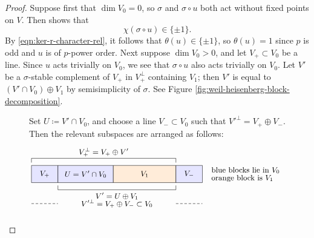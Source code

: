 \documentclass[reqno]{amsart}
\numberwithin{equation}{subsection}
\theoremstyle{remark}
\numberwithin{equation}{subsection}
\numberwithin{figure}{subsection}
\begin{document}
\begin{proof}
Suppose first that $\dim V_0 = 0$, so $\sigma$ and $\sigma \circ u$ both act without fixed points on $V$. Then \cite[Theorem 4.9.1(a)]{Ger77} shows that
\[
\chi(\sigma \circ u) \in \{\pm 1\}.
\]
By \eqref{eqn:ker-r-character-rel}, it follows that $\theta(u) \in \{\pm 1\}$, so $\theta(u) = 1$ since $p$ is odd and $u$ is of $p$-power order.  Next suppose $\dim V_0 > 0$, and let $V_+ \subset V_0$ be a line. Since $u$ acts trivially on $V_0$, we see that $\sigma \circ u$ also acts trivially on $V_0$. Let $V'$ be a $\sigma$-stable complement of $V_+$ in $V_+^\perp$ containing $V_1$; then $V'$ is equal to $(V' \cap V_0) \oplus V_1$ by semisimplicity of $\sigma$. See Figure \ref{fig:weil-heisenberg-block-decomposition}.

\begin{figure}[H]
\centering
\begin{minipage}{0.96\textwidth}
\small
Set \(U\coloneqq V'\cap V_0\), and choose a line \(V_- \subset V_0\) such that
\(V'^\perp=V_+\oplus V_-\). Then the relevant subspaces are arranged as follows:
\[
\begin{tikzpicture}[x=1cm,y=1cm, every node/.style={font=\small}]
\def\h{0.72}

\draw[fill=blue!10] (0,0) rectangle (1.1,\h);
\node at (0.55,0.36) {$V_+$};

\draw[fill=blue!10] (1.1,0) rectangle (3.4,\h);
\node at (2.25,0.36) {$U=V'\cap V_0$};

\draw[fill=orange!15] (3.4,0) rectangle (6.0,\h);
\node at (4.7,0.36) {$V_1$};

\draw[fill=blue!10] (6.0,0) rectangle (7.1,\h);
\node at (6.55,0.36) {$V_-$};

\draw (0,\h+0.12) -- (0,\h+0.30) -- (6.0,\h+0.30) -- (6.0,\h+0.12);
\node at (3.0,\h+0.56) {$V_+^\perp = V_+\oplus V'$};

\draw (1.1,-0.12) -- (1.1,-0.30) -- (6.0,-0.30) -- (6.0,-0.12);
\node at (3.55,-0.56) {$V'=U\oplus V_1$};

\draw[densely dashed] (0,-0.88) -- (1.1,-0.88);
\draw[densely dashed] (6.0,-0.88) -- (7.1,-0.88);
\node at (3.55,-0.88) {$V'^\perp=V_+\oplus V_- \subset V_0$};

\node[anchor=west] at (7.35,0.52) {blue blocks lie in \(V_0\)};
\node[anchor=west] at (7.35,0.18) {orange block is \(V_1\)};
\end{tikzpicture}
\]


\end{minipage}
\end{figure}
\end{proof}
\end{document}
